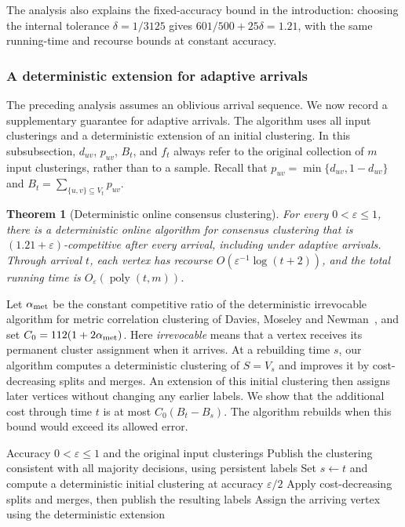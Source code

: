 \documentclass[11pt]{article}
\newtheorem{theorem}{Theorem}[section]
\begin{document}
The analysis also explains the fixed-accuracy bound in the introduction:
choosing the internal tolerance $\delta=1/3125$ gives
$601/500+25\delta=1.21$, with the same running-time and recourse
bounds at constant accuracy.


\subsubsection{A deterministic extension for adaptive arrivals}
\label{det:section}

The preceding analysis assumes an oblivious arrival sequence. We now
record a supplementary guarantee for adaptive arrivals. The algorithm
uses all input clusterings and a deterministic extension of an initial
clustering. In this subsubsection, $d_{uv}$, $p_{uv}$, $B_t$, and $f_t$
always refer to the original collection of $m$ input clusterings, rather
than to a sample. Recall that $p_{uv}=\min\{d_{uv},1-d_{uv}\}$ and
$B_t=\sum_{\{u,v\}\subseteq V_t}p_{uv}$.

\begin{theorem}[Deterministic online consensus clustering]
\label{on:deterministic}
For every $0<\varepsilon\le1$, there is a deterministic online algorithm
for consensus clustering that is $(1.21+\varepsilon)$-competitive after
every arrival, including under adaptive arrivals. Through arrival $t$,
each vertex has recourse $O(\varepsilon^{-1}\log(t+2))$, and the total
running time is $O_\varepsilon(\operatorname{poly}(t,m))$.
\end{theorem}

Let $\alpha_{\rm met}$ be the constant competitive ratio of the
deterministic irrevocable algorithm for metric correlation clustering
of Davies, Moseley and Newman~\cite{DMN2026}, and set
$C_0=112(1+2\alpha_{\rm met})$. Here \emph{irrevocable} means that a
vertex receives its permanent cluster assignment when it arrives.
At a rebuilding time $s$, our algorithm computes a deterministic
clustering of $S=V_s$ and improves it by cost-decreasing splits and
merges. An extension of this initial clustering then assigns later
vertices without changing any earlier labels. We show that the
additional cost through time $t$ is at most $C_0(B_t-B_s)$. The
algorithm rebuilds when this bound would exceed its allowed error.

\begin{algorithm}[htbp]
\caption{Deterministic online consensus clustering}
\label{alg:det-online}
\begin{algorithmic}[1]
\Require Accuracy $0<\varepsilon\le1$ and the original input clusterings
        \State Publish the clustering consistent with all majority decisions, using persistent labels
    \Else
            \State Set $s\gets t$ and compute a deterministic initial clustering at accuracy $\varepsilon/2$
            \State Apply cost-decreasing splits and merges, then publish the resulting labels
        \Else
            \State Assign the arriving vertex using the deterministic extension
        \EndIf
    \EndIf
\EndFor
\end{algorithmic}
\end{algorithm}
\end{document}
